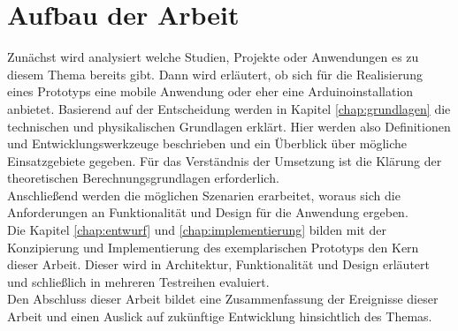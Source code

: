 \section{Aufbau der Arbeit}
Zunächst wird analysiert welche Studien, Projekte oder Anwendungen es zu diesem Thema bereits gibt. Dann wird erläutert, ob sich für die Realisierung eines Prototyps eine mobile Anwendung oder eher eine \gls{Arduino}installation anbietet. Basierend auf der Entscheidung werden in Kapitel \ref{chap:grundlagen} die technischen und physikalischen Grundlagen erklärt. Hier werden also Definitionen und Entwicklungswerkzeuge beschrieben und ein Überblick über mögliche Einsatzgebiete gegeben. Für das Verständnis der Umsetzung ist die Klärung der theoretischen Berechnungsgrundlagen erforderlich. \\
Anschließend werden die möglichen Szenarien erarbeitet, woraus sich die Anforderungen an Funktionalität und Design für die Anwendung ergeben.\\ 
Die Kapitel \ref{chap:entwurf} und \ref{chap:implementierung} bilden mit der Konzipierung und Implementierung des exemplarischen Prototyps den Kern dieser Arbeit. Dieser wird in Architektur, Funktionalität und Design erläutert und schließlich in mehreren Testreihen evaluiert.\\ 
Den Abschluss dieser Arbeit bildet eine Zusammenfassung der Ereignisse dieser Arbeit und einen Auslick auf zukünftige Entwicklung hinsichtlich des Themas.
